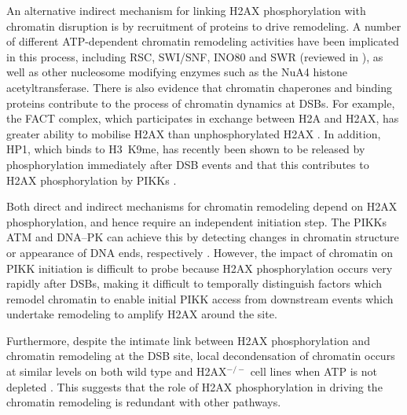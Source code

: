 An alternative indirect mechanism for linking H2AX phosphorylation with chromatin disruption is by
recruitment of proteins to drive remodeling. A number of different ATP-dependent chromatin remodeling
activities have been implicated in this process, including RSC, SWI/SNF, INO80 and SWR (reviewed
in \citet{JAD07}), as well as other nucleosome modifying enzymes such as the NuA4 histone
acetyltransferase. There is also evidence that chromatin chaperones and binding proteins contribute
to the process of chromatin dynamics at DSBs. For example, the FACT complex, which participates in
exchange between H2A and H2AX, has greater ability to mobilise \textgamma H2AX than unphosphorylated
H2AX \citep{KHHK+08}. In addition, HP1\textbeta, which binds to H3~K9me, has recently been shown to be
released by phosphorylation immediately after DSB events and that this contributes to H2AX
phosphorylation by PIKKs \citep{AJB+08}.

Both direct and indirect mechanisms for chromatin remodeling depend on H2AX phosphorylation, and
hence require an independent initiation step. The PIKKs ATM and DNA--PK can achieve this by
detecting changes in chromatin structure or appearance of DNA ends, respectively \citep{CJB03,BC04}.
However, the impact of chromatin on PIKK initiation is difficult to probe because H2AX phosphorylation
occurs very rapidly after DSBs, making it difficult to temporally distinguish factors which remodel
chromatin to enable initial PIKK access from downstream events which undertake remodeling to
amplify \textgamma H2AX around the site.

Furthermore, despite the intimate link between H2AX phosphorylation and chromatin remodeling at the
DSB site, local decondensation of chromatin occurs at similar levels on both wild type and H2AX$^{-/-}$ cell
lines when ATP is not depleted \citep{MJK+06}. This suggests that the role of H2AX phosphorylation in
driving the chromatin remodeling is redundant with other pathways.

